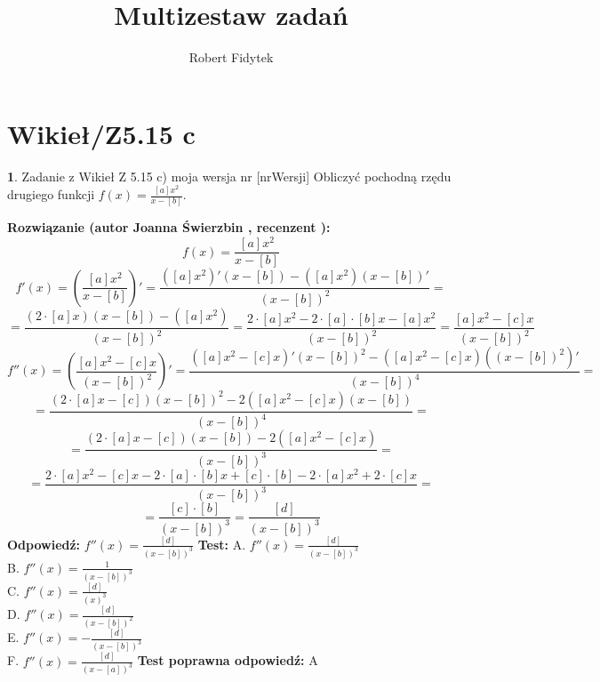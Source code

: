 \documentclass[12pt, a4paper]{article}
\title{Multizestaw zadań}
\author{Robert Fidytek}
\date{}
\theoremstyle{definition} %
\newtheorem{zad}{}
\newcommand{\kategoria}[1]{\section{#1}} %
\newcommand{\zadStart}[1]{\begin{zad}#1\newline} %
\newcommand{\zadStop}{\end{zad}}   %
\newcommand{\rozwStart}[2]{\noindent \textbf{Rozwiązanie (autor #1 , recenzent #2): }\newline} %
\newcommand{\rozwStop}{\newline}                                            %
\newcommand{\odpStart}{\noindent \textbf{Odpowiedź:}\newline}    %
\newcommand{\odpStop}{\newline}                                             %
\newcommand{\testStart}{\noindent \textbf{Test:}\newline} %
\newcommand{\testStop}{\newline} %
\newcommand{\kluczStart}{\noindent \textbf{Test poprawna odpowiedź:}\newline} %
\newcommand{\kluczStop}{\newline} %
\begin{document}
\maketitle


\kategoria{Wikieł/Z5.15 c}
\zadStart{Zadanie z Wikieł Z 5.15 c) moja wersja nr [nrWersji]}
Obliczyć pochodną rzędu drugiego funkcji $f(x)=\frac{[a]x^2}{x-[b]}$.
\zadStop
\rozwStart{Joanna Świerzbin}{}
$$f(x)=\frac{[a]x^2}{x-[b]}$$
$$f'(x)= \left( \frac{[a]x^2}{x-[b]} \right)' = \frac{([a]x^2)'(x-[b])-([a]x^2)(x-[b])'}{(x-[b])^2} =$$
$$= \frac{(2\cdot[a]x)(x-[b])-([a]x^2)}{(x-[b])^2} = \frac{2\cdot[a]x^2-2\cdot[a]\cdot[b]x-[a]x^2}{(x-[b])^2} = \frac{[a]x^2-[c]x}{(x-[b])^2} $$
$$f''(x)= \left( \frac{[a]x^2-[c]x}{(x-[b])^2} \right)'= \frac{([a]x^2-[c]x)'(x-[b])^2-([a]x^2-[c]x)((x-[b])^2)'}{(x-[b])^4} = $$
$$= \frac{(2\cdot[a]x-[c])(x-[b])^2-2([a]x^2-[c]x)(x-[b])}{(x-[b])^4} = $$
$$= \frac{(2\cdot[a]x-[c])(x-[b])-2([a]x^2-[c]x)}{(x-[b])^3} = $$
$$= \frac{2\cdot[a]x^2-[c]x -2\cdot[a]\cdot[b]x+[c]\cdot[b]-2\cdot[a]x^2+2\cdot[c]x}{(x-[b])^3} = $$
$$= \frac{[c]\cdot[b]}{(x-[b])^3} = \frac{[d]}{(x-[b])^3} $$
\rozwStop
\odpStart
$f''(x) = \frac{[d]}{(x-[b])^3} $
\odpStop
\testStart
A. $f''(x) = \frac{[d]}{(x-[b])^3} $\\
B. $f''(x) = \frac{1}{(x-[b])^3} $ \\
C. $f''(x) = \frac{[d]}{(x)^3} $\\
D. $f''(x) = \frac{[d]}{(x-[b])^2} $\\
E. $f''(x) = -\frac{[d]}{(x-[b])^3} $\\
F. $f''(x) = \frac{[d]}{(x-[a])^3} $
\testStop
\kluczStart
A
\kluczStop
\end{document}
